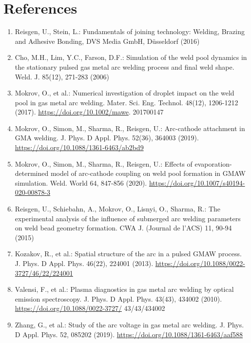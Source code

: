 \documentclass[10pt]{article}
\begin{document}
\section*{References}
\begin{enumerate}
  \item Reisgen, U., Stein, L.: Fundamentals of joining technology: Welding, Brazing and Adhesive Bonding, DVS Media GmbH, Düsseldorf (2016)

  \item Cho, M.H., Lim, Y.C., Farson, D.F.: Simulation of the weld pool dynamics in the stationary pulsed gas metal arc welding process and final weld shape. Weld. J. 85(12), 271-283 (2006)

  \item Mokrov, O., et al.: Numerical investigation of droplet impact on the weld pool in gas metal arc welding. Mater. Sci. Eng. Technol. 48(12), 1206-1212 (2017). \href{https://doi.org/10.1002/mawe}{https://doi.org/10.1002/mawe}. 201700147

  \item Mokrov, O., Simon, M., Sharma, R., Reisgen, U.: Arc-cathode attachment in GMA welding. J. Phys. D Appl. Phys. 52(36), 364003 (2019). \href{https://doi.org/10.1088/1361-6463/ab2bd9}{https://doi.org/10.1088/1361-6463/ab2bd9}

  \item Mokrov, O., Simon, M., Sharma, R., Reisgen, U.: Effects of evaporation-determined model of arc-cathode coupling on weld pool formation in GMAW simulation. Weld. World 64, 847-856 (2020). \href{https://doi.org/10.1007/s40194-020-00878-3}{https://doi.org/10.1007/s40194-020-00878-3}

  \item Reisgen, U., Schiebahn, A., Mokrov, O., Lisnyi, O., Sharma, R.: The experimental analysis of the influence of submerged arc welding parameters on weld bead geometry formation. CWA J. (Journal de l'ACS) 11, 90-94 (2015)

  \item Kozakov, R., et al.: Spatial structure of the arc in a pulsed GMAW process. J. Phys. D Appl. Phys. 46(22), 224001 (2013). \href{https://doi.org/10.1088/0022-3727/46/22/224001}{https://doi.org/10.1088/0022-3727/46/22/224001}

  \item Valensi, F., et al.: Plasma diagnostics in gas metal arc welding by optical emission spectroscopy. J. Phys. D Appl. Phys. 43(43), 434002 (2010). \href{https://doi.org/10.1088/0022-3727/}{https://doi.org/10.1088/0022-3727/} 43/43/434002

  \item Zhang, G., et al.: Study of the arc voltage in gas metal arc welding. J. Phys. D Appl. Phys. 52, 085202 (2019). \href{https://doi.org/10.1088/1361-6463/aaf588}{https://doi.org/10.1088/1361-6463/aaf588}

\end{enumerate}
\end{document}
